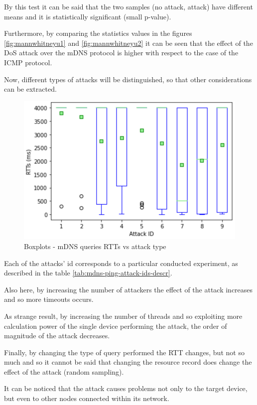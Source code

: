 \documentclass[fleqn, 11pt]{SelfArx} %
\begin{document}
By this test it can be said that the two samples (no attack, attack) have different means and it is statistically significant (small p-value).

Furthermore, by comparing the statistics values in the figures \ref{fig:mannwhitneyu1} and \ref{fig:mannwhitneyu2} it can be seen that the effect of the DoS attack over the mDNS protocol is higher with respect to the case of the ICMP protocol. 

Now, different types of attacks will be distinguished, so that other considerations can be extracted.

\begin{figure}[H]\centering
    \includegraphics[width=\linewidth]{./mdns/mdns-boxplot2.png}
    \caption{Boxplots - mDNS queries RTTs vs attack type}
	\label{fig:mdnsbp2}
\end{figure}

Each of the attacks' id corresponds to a particular conducted experiment, as described in the table \ref{tab:mdns-ping-attack-ids-descr}.

Also here, by increasing the number of attackers the effect of the attack increases and so more timeouts occurs.

As strange result, by increasing the number of threads and so exploiting more calculation power of the single device performing the attack, the order of magnitude of the attack decreases.

Finally, by changing the type of query performed the RTT changes, but not so much and so it cannot be said that changing the resource record does change the effect of the attack (random sampling).

It can be noticed that the attack causes problems not only to the target device, but even to other nodes connected within its network.
\end{document}
